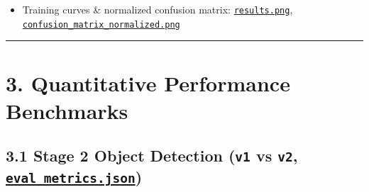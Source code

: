 \documentclass[10.5pt,a4paper]{article}
\begin{document}
\begin{itemize}[leftmargin=1.5em,itemsep=2pt]
\item Training curves \& normalized confusion matrix: \href{https://github.com/Heisnotanimposter/Totalcare\_autonomous\_driving\_Yolov5/blob/main/results/v2\_improved/outputs/train\_results/results.png}{\texttt{results.\allowbreak{}png}}, \href{https://github.com/Heisnotanimposter/Totalcare\_autonomous\_driving\_Yolov5/blob/main/results/v2\_improved/outputs/train\_results/confusion\_matrix\_normalized.png}{\texttt{confusion\_\allowbreak{}matrix\_\allowbreak{}normalized.\allowbreak{}png}}
\end{itemize}

\par\noindent\rule{\textwidth}{0.4pt}\par\medskip

\section{3. Quantitative Performance Benchmarks}

\subsection{3.1 Stage 2 Object Detection (\texttt{v1} vs \texttt{v2}, \href{https://github.com/Heisnotanimposter/Totalcare\_autonomous\_driving\_Yolov5/blob/main/results/v2\_improved/outputs/eval\_metrics.json}{\texttt{eval\_\allowbreak{}metrics.\allowbreak{}json}})}
\end{document}
